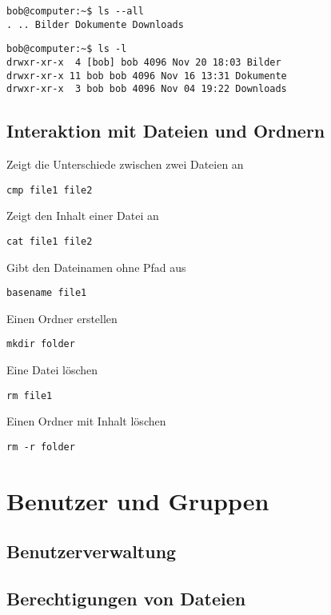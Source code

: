 \begin{lstlisting}[style=terminal]
bob@computer:~$ ls --all
. .. Bilder Dokumente Downloads
\end{lstlisting}

\begin{lstlisting}[style=terminal]
bob@computer:~$ ls -l
drwxr-xr-x  4 [bob] bob 4096 Nov 20 18:03 Bilder
drwxr-xr-x 11 bob bob 4096 Nov 16 13:31 Dokumente
drwxr-xr-x  3 bob bob 4096 Nov 04 19:22 Downloads
\end{lstlisting}

\subsection {Interaktion mit Dateien und Ordnern}

\begin{multicols}{2}
Zeigt die Unterschiede zwischen zwei Dateien an
\begin{lstlisting}
cmp file1 file2
\end{lstlisting}
\columnbreak
Zeigt den Inhalt einer Datei an
\begin{lstlisting}
cat file1 file2
\end{lstlisting}
\end{multicols}

\begin{multicols}{2}
Gibt den Dateinamen ohne Pfad aus
\begin{lstlisting}
basename file1
\end{lstlisting}
\columnbreak
Einen Ordner erstellen
\begin{lstlisting}
mkdir folder
\end{lstlisting}
\end{multicols}

\begin{multicols}{2}
Eine Datei löschen
\begin{lstlisting}
rm file1
\end{lstlisting}
\columnbreak
Einen Ordner mit Inhalt löschen
\begin{lstlisting}
rm -r folder
\end{lstlisting}
\end{multicols}

\section {Benutzer und Gruppen}

\subsection {Benutzerverwaltung}

\subsection {Berechtigungen von Dateien}

